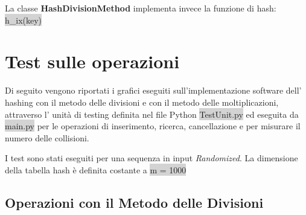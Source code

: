 \documentclass{article}
\begin{document}
		La classe \textbf{HashDivisionMethod} implementa invece la funzione di hash:
		\newline
		\colorbox{lightgray}{h\_ix(key)}
		

	\section{Test sulle operazioni}
		Di seguito vengono riportati i grafici eseguiti sull'implementazione software dell' hashing con il metodo delle divisioni e con il metodo delle moltiplicazioni, attraverso l' unità di testing definita nel file Python \colorbox{lightgray}{TestUnit.py} ed eseguita da \colorbox{lightgray}{main.py} per le operazioni di inserimento, ricerca, cancellazione e per misurare il numero delle collisioni.
		
		I test sono stati eseguiti per una sequenza in input \textit{Randomized}. La dimensione della tabella hash è definita costante a \colorbox{lightgray}{m = 1000}
		
		
		\newpage
		\subsection{Operazioni con il Metodo delle Divisioni}
			
\end{document}
